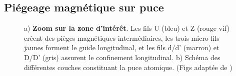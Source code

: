 \subsection{Piégeage magnétique sur puce}

\begin{figure}[H]
	\centering
	\caption{a) {\bf Zoom sur la zone d’intérêt}. Les fils {\color{\colorFour}U (bleu)} et {\color{\colorSix} Z (rouge vif)} créent des pièges magnétiques intermédiaires, les trois micro-fils {jaunes} forment le guide longitudinal, et les fils {\color{\colorFive} d/d' (marron)} et {\color{\colorThree} D/D' (gris)} assurent le confinement longitudinal. b) Schéma des différentes couches constituant la puce atomique. (Figs adaptée de \cite{L.Dubois2024})}
	\label{chap:5:fig:puce_zoom_coup}
\end{figure}

